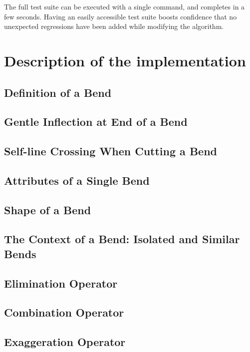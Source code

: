 \documentclass[a4paper]{article}
\begin{document}
The full test suite can be executed with a single command, and completes in a
few seconds. Having an easily accessible test suite boosts confidence that no
unexpected regressions have been added while modifying the algorithm.

\section{Description of the implementation}

\subsection{Definition of a Bend}

\subsection{Gentle Inflection at End of a Bend}

\subsection{Self-line Crossing When Cutting a Bend}

\subsection{Attributes of a Single Bend}

\subsection{Shape of a Bend}

\subsection{The Context of a Bend: Isolated and Similar Bends}

\subsection{Elimination Operator}

\subsection{Combination Operator}

\subsection{Exaggeration Operator}
\end{document}
